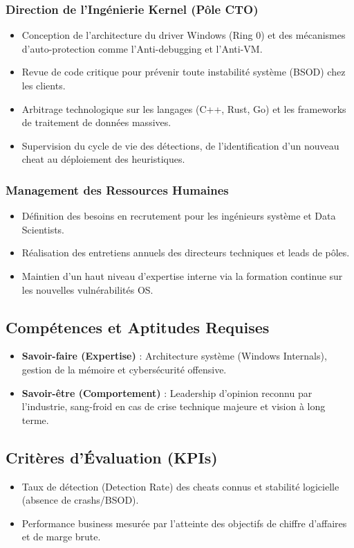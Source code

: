 \documentclass[12pt,a4paper]{article}
\begin{document}
\subsubsection{Direction de l'Ingénierie Kernel (Pôle CTO)}
\begin{itemize}[label=\textbullet]
    \item Conception de l'architecture du driver Windows (Ring 0) et des mécanismes d'auto-protection comme l'Anti-debugging et l'Anti-VM.
    \item Revue de code critique pour prévenir toute instabilité système (BSOD) chez les clients.
    \item Arbitrage technologique sur les langages (C++, Rust, Go) et les frameworks de traitement de données massives.
    \item Supervision du cycle de vie des détections, de l'identification d'un nouveau cheat au déploiement des heuristiques.
\end{itemize}

\subsubsection{Management des Ressources Humaines}
\begin{itemize}[label=\textbullet]
    \item Définition des besoins en recrutement pour les ingénieurs système et Data Scientists.
    \item Réalisation des entretiens annuels des directeurs techniques et leads de pôles.
    \item Maintien d'un haut niveau d'expertise interne via la formation continue sur les nouvelles vulnérabilités OS.
\end{itemize}

\subsection{Compétences et Aptitudes Requises}
\begin{itemize}[label=\textbullet]
    \item \textbf{Savoir-faire (Expertise)} : Architecture système (Windows Internals), gestion de la mémoire et cybersécurité offensive.
    \item \textbf{Savoir-être (Comportement)} : Leadership d'opinion reconnu par l'industrie, sang-froid en cas de crise technique majeure et vision à long terme.
\end{itemize}

\subsection{Critères d'Évaluation (KPIs)}
\begin{itemize}[label=\textbullet]
    \item Taux de détection (Detection Rate) des cheats connus et stabilité logicielle (absence de crashs/BSOD).
    \item Performance business mesurée par l'atteinte des objectifs de chiffre d'affaires et de marge brute.
\end{itemize}
\end{document}
